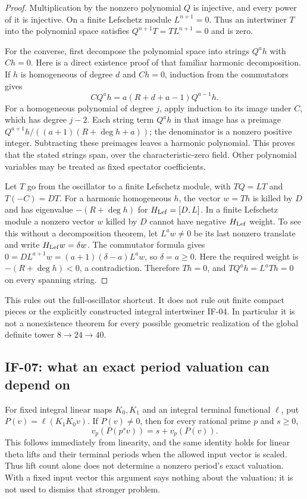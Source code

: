 \begin{proof}
Multiplication by the nonzero polynomial $Q$ is injective, and every
power of it is injective. On a finite Lefschetz module $L^{n+1}=0$.
Thus an intertwiner $T$ into the polynomial space satisfies
$Q^{n+1}T=TL^{n+1}=0$ and is zero.

For the converse, first decompose the polynomial space into strings
$Q^a h$ with $Ch=0$. Here is a direct existence proof of that familiar
harmonic decomposition. If $h$ is homogeneous of degree $d$ and
$Ch=0$, induction from the commutators gives
\[
 C Q^a h=a(R+d+a-1)Q^{a-1}h.                       \tag{IF-06a}
\]
For a homogeneous polynomial of degree $j$, apply induction to its
image under $C$, which has degree $j-2$. Each string term $Q^a h$
in that image has a preimage
$Q^{a+1}h/((a+1)(R+\deg h+a))$; the denominator is a nonzero positive
integer. Subtracting these preimages leaves a harmonic polynomial.
This proves that the stated strings span, over the characteristic-zero
field. Other polynomial variables may be treated as fixed spectator
coefficients.

Let $T$ go from the oscillator to a finite Lefschetz module, with
$TQ=LT$ and $T(-C)=DT$. For a harmonic homogeneous $h$, the vector
$w=Th$ is killed by $D$ and has eigenvalue $-(R+\deg h)$ for
$H_{\rm Lef}=[D,L]$. In a finite Lefschetz module a nonzero vector
$w$ killed by $D$ cannot have negative $H_{\rm Lef}$ weight. To see
this without a decomposition theorem, let $L^a w\ne0$ be its last
nonzero translate and write $H_{\rm Lef}w=\delta w$. The commutator
formula gives
$0=DL^{a+1}w=(a+1)(\delta-a)L^a w$, so $\delta=a\geq0$.
Here the required weight is $-(R+\deg h)<0$, a contradiction.
Therefore $Th=0$, and $TQ^a h=L^aTh=0$ on every spanning string.
\end{proof}

This rules out the full-oscillator shortcut. It does not rule out
finite compact pieces or the explicitly constructed integral
intertwiner IF-04. In particular it is not a nonexistence theorem for
every possible geometric realization of the global definite tower
$8\to24\to40$.

\subsection{IF-07: what an exact period valuation can depend on}
For fixed integral linear maps $K_0,K_1$ and an integral terminal
functional $\ell$, put $P(v)=\ell(K_1K_0v)$. If $P(v)\ne0$, then
for every rational prime $p$ and $s\geq0$,
\[
 v_p(P(p^s v))=s+v_p(P(v)).
\]
This follows immediately from linearity, and the same identity holds
for linear theta lifts and their terminal periods when the allowed
input vector is scaled. Thus lift count alone does not determine a
nonzero period's exact valuation. With a fixed input vector this
argument says nothing about the valuation; it is not used to dismiss
that stronger problem.

